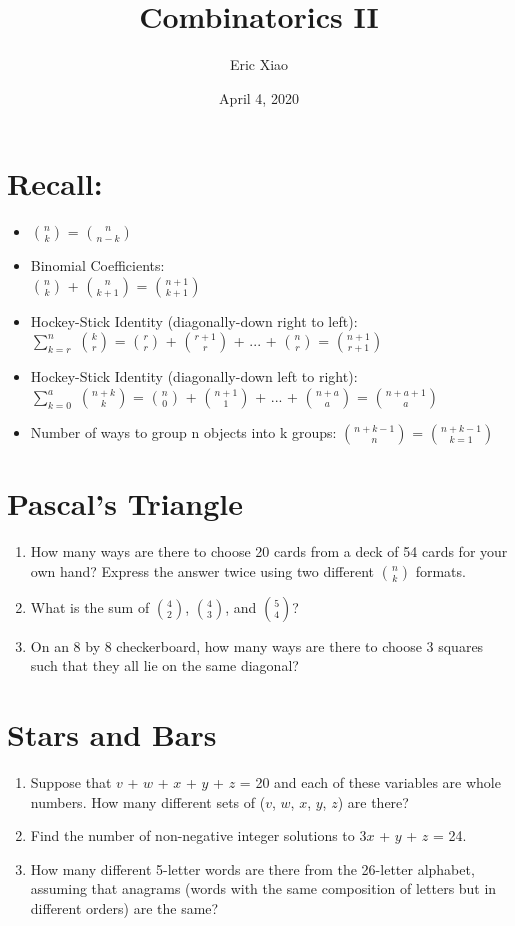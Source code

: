 \documentclass[12pt]{extarticle}
\title{Combinatorics II}
\author{Eric Xiao}
\date{April 4, 2020}
\begin{document}
\maketitle

\section{Recall:}
\begin{itemize}
    \itemsep 1.0em
    \item {$\binom{n}{k}$ = $\binom{n}{n-k}$}
    \item {Binomial Coefficients:\\$\binom{n}{k}$ + $\binom{n}{k+1}$ = $\binom{n+1}{k+1}$}
    \item {Hockey-Stick Identity (diagonally-down right to left):\\$\displaystyle\sum_{k=r}^{n}$ $\binom{k}{r}$ = $\binom{r}{r}$ + $\binom{r+1}{r}$ + ... + $\binom{n}{r}$ = $\binom{n+1}{r+1}$}
    \item {Hockey-Stick Identity (diagonally-down left to right):\\$\displaystyle\sum_{k=0}^{a}$ $\binom{n+k}{k}$ = $\binom{n}{0}$ + $\binom{n+1}{1}$ + ... + $\binom{n+a}{a}$ = $\binom{n+a+1}{a}$}
    \item {Number of ways to group n objects into k groups: $\binom{n+k-1}{n}$ = $\binom{n+k-1}{k=1}$}
\end{itemize}

\section{Pascal's Triangle}
\begin{enumerate}
    \itemsep 2.0em
    \item {How many ways are there to choose 20 cards from a deck of 54 cards for your own hand? Express the answer twice using two different $\binom{n}{k}$ formats.}
    \item {What is the sum of $\binom{4}{2}$, $\binom{4}{3}$, and $\binom{5}{4}$?}
    \item {On an 8 by 8 checkerboard, how many ways are there to choose 3 squares such that they all lie on the same diagonal?}
\end{enumerate}

\section{Stars and Bars}
\begin{enumerate}
    \itemsep 2.0em
    \item {Suppose that $v$ + $w$ + $x$ + $y$ + $z$ = 20 and each of these variables are whole numbers. How many different sets of ($v$, $w$, $x$, $y$, $z$) are there?}
    \item {Find the number of non-negative integer solutions to $3x$ + $y$ + $z$ = 24.}
    \item {How many different 5-letter words are there from the 26-letter alphabet, assuming that anagrams (words with the same composition of letters but in different orders) are the same?}
\end{enumerate}
\end{document}
